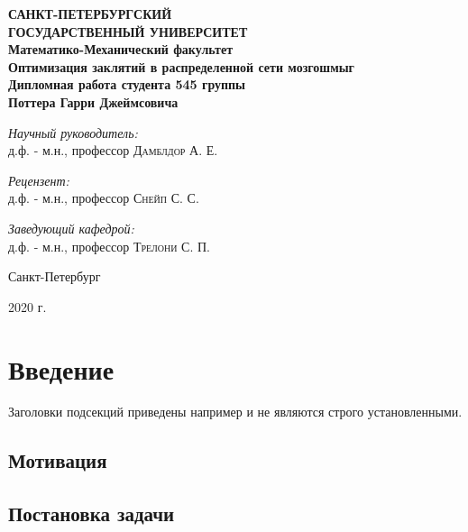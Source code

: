 \documentclass[aps,%
12pt,%
final,%
oneside,
onecolumn,%
musixtex, %
superscriptaddress,%
centertags]{article} %
\begin{document}
\begin{titlepage}
\begin{center}
\textbf{\Large САНКТ-ПЕТЕРБУРГСКИЙ \\ ГОСУДАРСТВЕННЫЙ УНИВЕРСИТЕТ} \\[1.0cm]
\textbf{\large Математико-Механический факультет} \\[0.2cm]

\textbf{\LARGE Оптимизация заклятий в распределенной сети мозгошмыг}\\[1.0cm]
\textbf{\Large Дипломная работа студента 545 группы} \\[0.2cm]
\textbf{\Large Поттера Гарри Джеймсовича} \\[3.5cm]

\begin{flushright} \large
\emph{Научный руководитель:} \\
д.ф. - м.н., профессор \textsc{Дамблдор А. Е.}
\end{flushright}
 \begin{flushright} \large
\emph{Рецензент:} \\
д.ф. - м.н., профессор \textsc{Снейп С. С.}
\end{flushright}
\begin{flushright} \large
\emph{Заведующий кафедрой:} \\
д.ф. - м.н., профессор \textsc{Трелони С. П.}
\end{flushright}
\vfill

{\large {Санкт-Петербург}} \par
{\large {2020 г.}}
\end{center}
\end{titlepage}

\tableofcontents

\section{Введение}
Заголовки подсекций приведены например и не являются строго установленными.
\subsection{Мотивация}
\subsection{Постановка задачи}
\end{document}
